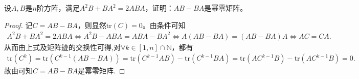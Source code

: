 \documentclass[../../main.tex]{subfiles}
\begin{document}
\begin{example}
设$A,B$是$n$阶方阵，满足$A^2B + BA^2 = 2ABA$，证明：$AB - BA$是幂零矩阵。 
\end{example}
\begin{proof}
记$C = AB - BA$，则显然$\mathrm{tr}(C)=0$。由条件可知
\begin{align*}
A^2B + BA^2 = 2ABA \Longleftrightarrow A^2B - ABA = ABA - BA^2 
\Longleftrightarrow A(AB - BA) = (AB - BA)A \Longleftrightarrow AC = CA.
\end{align*}
从而由上式及矩阵迹的交换性可得,对$\forall k\in [1,n]\cap \mathbb{N}$，都有
\begin{align*}
\mathrm{tr}(C^k) = \mathrm{tr}(C^{k - 1}(AB - BA)) = \mathrm{tr}(C^{k - 1}AB) - \mathrm{tr}(C^{k - 1}BA) 
= \mathrm{tr}(AC^{k - 1}B) - \mathrm{tr}(AC^{k - 1}B) = 0.
\end{align*}
故由可知$C=AB-BA$是幂零矩阵.
\end{proof}
\end{document}
